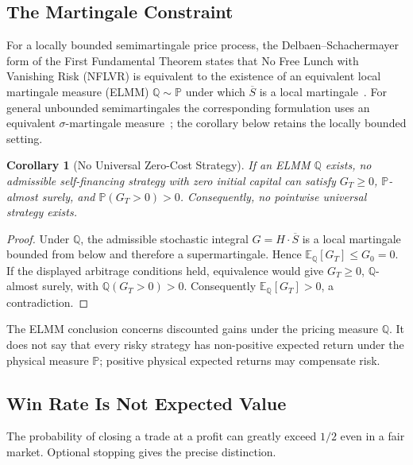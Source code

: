 \documentclass[aps,pra,reprint,superscriptaddress,amsmath,amssymb,floatfix]{revtex4-2}
\theoremstyle{plain}
\newtheorem{corollary}[theorem]{Corollary}
\theoremstyle{definition}
\theoremstyle{remark}
\begin{document}
\subsection{The Martingale Constraint}

For a locally bounded semimartingale price process, the
Delbaen--Schachermayer form of the First Fundamental Theorem states that No
Free Lunch with Vanishing Risk (NFLVR) is equivalent to the existence of an
equivalent local martingale measure (ELMM)
\(\mathbb{Q}\sim\mathbb{P}\) under which \(\overline S\) is a local
martingale~\cite{Harrison1981,Delbaen1994}. For general unbounded
semimartingales the corresponding formulation uses an equivalent
\(\sigma\)-martingale measure~\cite{DelbaenSchachermayer1998}; the corollary below
retains the locally bounded setting.

\begin{corollary}[No Universal Zero-Cost Strategy]
  \label{cor:noarb}
  If an ELMM \(\mathbb{Q}\) exists, no admissible self-financing strategy with
  zero initial capital can satisfy
  \(G_T\geq0\), \(\mathbb{P}\)-almost surely, and
  \(\mathbb{P}(G_T>0)>0\). Consequently, no pointwise universal strategy
  exists.
\end{corollary}

\begin{proof}
Under \(\mathbb{Q}\), the admissible stochastic integral
\(G=H\mathbin{\cdot}\overline S\) is a local martingale bounded from below and
therefore a supermartingale. Hence
\(\mathbb{E}_{\mathbb{Q}}[G_T]\leq G_0=0\). If the displayed arbitrage
conditions held, equivalence would give \(G_T\geq0\),
\(\mathbb{Q}\)-almost surely, with
\(\mathbb{Q}(G_T>0)>0\). Consequently
\(\mathbb{E}_{\mathbb{Q}}[G_T]>0\), a contradiction.
\end{proof}

The ELMM conclusion concerns discounted gains under the pricing measure
\(\mathbb{Q}\). It does not say that every risky strategy has non-positive
expected return under the physical measure \(\mathbb{P}\); positive physical
expected returns may compensate risk.

\subsection{Win Rate Is Not Expected Value}

The probability of closing a trade at a profit can greatly exceed \(1/2\)
even in a fair market. Optional stopping gives the precise distinction.
\end{document}
